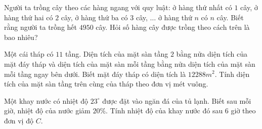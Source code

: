 \begin{bt} %
	Người ta trồng cây theo các hàng ngang với quy luật: ở hàng thứ nhất có $1$ cây, ở hàng thứ hai có $2$ cây, ở hàng thứ ba có $3$ cây, $\ldots$ ở hàng thứ $n$ có $n$ cây. Biết rằng người ta trồng hết $4950$ cây. Hỏi số hàng cây được trồng theo cách trên là bao nhiêu?
\end{bt}

\begin{bt} %
	Một cái tháp có $11$ tầng. Diện tích của mặt sàn tầng $2$ bằng nửa diện tích của mặt đáy tháp và diện tích của mặt sàn mỗi tầng bằng nửa diện tích của mặt sàn mỗi tầng ngay bên dưới. Biết mặt đáy tháp có diện tích là $12 288m^2$. Tính diện tích của mặt sàn tầng trên cùng của tháp theo đơn vị mét vuông.
\end{bt}

\begin{bt} %
	Một khay nước có nhiệt độ $23^\circ$ được đặt vào ngăn đá của tủ lạnh. Biết sau mỗi giờ, nhiệt độ của nước giảm $20\%$. Tính nhiệt độ của khay nước đó sau $6$ giờ theo đơn vị độ $C$.
	
\end{bt}

